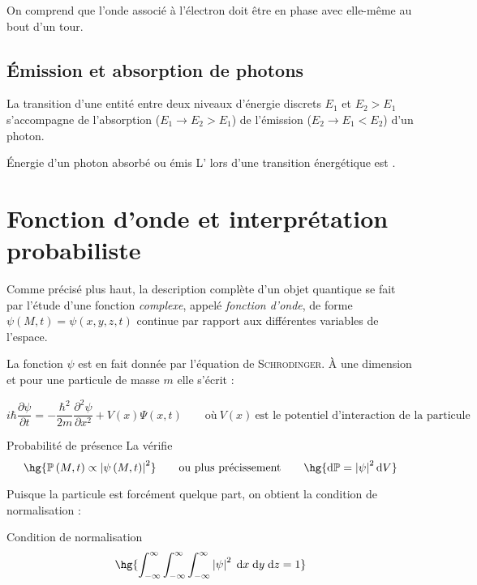 \documentclass[a4paper,french,bookmarks]{article}
\begin{document}
On comprend que l'onde associé à l'électron doit être en phase avec elle-même au bout d'un tour.

\subsection{Émission et absorption de photons}

La transition d'une entité entre deux niveaux d'énergie discrets $E_1$ et $E_2 > E_1$ s'accompagne de l'absorption ($E_1 \to E_2 > E_1$) de l'émission ($E_2 \to E_1 < E_2$) d'un photon.

\begin{property}{Énergie d'un photon absorbé ou émis}{}
    L' lors d'une transition énergétique  est .
\end{property}

\section{Fonction d'onde et interprétation probabiliste}

Comme précisé plus haut, la description complète d'un objet quantique se fait par l'étude d'une fonction \textit{complexe}, appelé \textit{\color{main1} fonction d'onde}, de forme $\psi\left(M, t\right) = \psi\left(x, y, z, t\right)$ continue par rapport aux différentes variables de l'espace.

\begin{hpnote}
    La fonction $\psi$ est en fait donnée par l'équation de \textsc{Schrodinger}.  À une dimension et pour une particule de masse $m$ elle s'écrit :
    
    \[ i\hbar \dfrac{\partial \psi}{\partial t} = -\dfrac{\hbar^2}{2m}\dfrac{\partial^2\psi}{\partial x^2} + V\left(x\right)\Psi\left(x, t\right) \qquad\text{où} \ V\left(x\right) \ \text{est le potentiel d'interaction de la particule}\]
\end{hpnote}


\begin{property}{Probabilité de présence}{}
    La  vérifie
    \[ \hg{\bdP\left(M, t\right) \propto \mod{\psi\left(M, t\right)}^2} \qquad\text{ou plus précissement}\qquad \hg{\dif \bdP = \mod{\psi}^2\dif V}\]
\end{property}

Puisque la particule est forcément quelque part, on obtient la condition de normalisation :

\begin{property}{Condition de normalisation}{}
    \[ \hg{\int_{-\infty}^{\infty}\int_{-\infty}^{\infty}\int_{-\infty}^{\infty} \mod{\psi}^2\;\dif x\; \dif y\; \dif z = 1}\]
\end{property}
\end{document}
